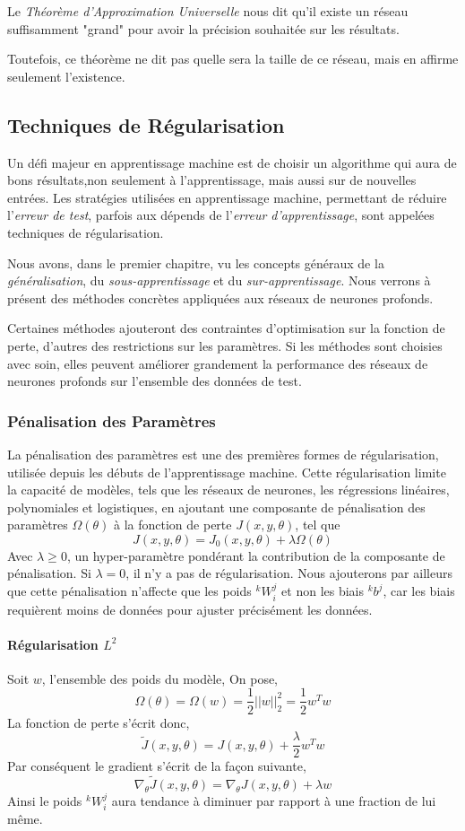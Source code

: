 \documentclass[a4paper, 11pt]{report}
\newcommand{\lexp}[1]{\phantom{}^{#1}}
\newcommand{\elem}[4]{\lexp{#2}#1^{#3}_{#4}}
\begin{document}
Le \emph{Théorème d'Approximation Universelle} \citep{Hornik1991} nous dit qu'il existe un réseau suffisamment "grand" pour avoir la précision souhaitée sur les résultats.

Toutefois, ce théorème ne dit pas quelle sera la taille de ce réseau, mais en affirme seulement l'existence.
\subsection{Techniques de Régularisation}
Un défi majeur en apprentissage machine est de choisir un algorithme qui aura de bons résultats,non seulement à l'apprentissage, mais aussi sur de nouvelles entrées.
Les stratégies utilisées en apprentissage machine, permettant de réduire l'\emph{erreur de test}, parfois aux dépends de l'\emph{erreur d'apprentissage}, sont appelées techniques de régularisation.

Nous avons, dans le premier chapitre, vu les concepts généraux de la \emph{généralisation}, du \emph{sous-apprentissage} et du \emph{sur-apprentissage}.
Nous verrons à présent des méthodes concrètes appliquées aux réseaux de neurones profonds.

Certaines méthodes ajouteront des contraintes d'optimisation sur la fonction de perte, d'autres des restrictions sur les paramètres.
Si les méthodes sont choisies avec soin, elles peuvent améliorer grandement la performance des réseaux de neurones profonds sur l'ensemble des données de test.
\subsubsection{Pénalisation des Paramètres}
La pénalisation des paramètres est une des premières formes de régularisation, utilisée depuis les débuts de l'apprentissage machine.
Cette régularisation \citep{Ng2004} limite la capacité de modèles, tels que les réseaux de neurones, les régressions linéaires, polynomiales et logistiques, en ajoutant une composante de pénalisation des paramètres $\Omega(\theta)$ à la fonction de perte $J(x,y,\theta)$, tel que
$$J(x,y,\theta) = J_0(x,y,\theta) + \lambda \Omega(\theta)$$
Avec $\lambda \geq 0$, un hyper-paramètre pondérant la contribution de la composante de pénalisation.
Si $\lambda = 0$, il n'y a pas de régularisation.
Nous ajouterons par ailleurs que cette pénalisation n'affecte que les poids $\elem{W}{k}{j}{i}$ et non les biais $\elem{b}{k}{j}{}$, car les biais requièrent moins de données pour ajuster précisément les données.
\paragraph{Régularisation $L^2$}
Soit $w$, l'ensemble des poids du modèle,
On pose, $$\Omega(\theta) = \Omega(w) = \frac{1}{2} ||w||_2^2 = \frac{1}{2} w^T w$$
La fonction de perte s'écrit donc,
$$\tilde{J}(x,y,\theta) = J(x,y,\theta) + \frac{\lambda}{2} w^T w$$
Par conséquent le gradient s'écrit de la façon suivante,
$$\nabla_\theta \tilde{J}(x,y,\theta) = \nabla_\theta J(x,y,\theta) + \lambda w$$
Ainsi le poids $\elem{W}{k}{j}{i}$ aura tendance à diminuer par rapport à une fraction de lui même.
\end{document}
